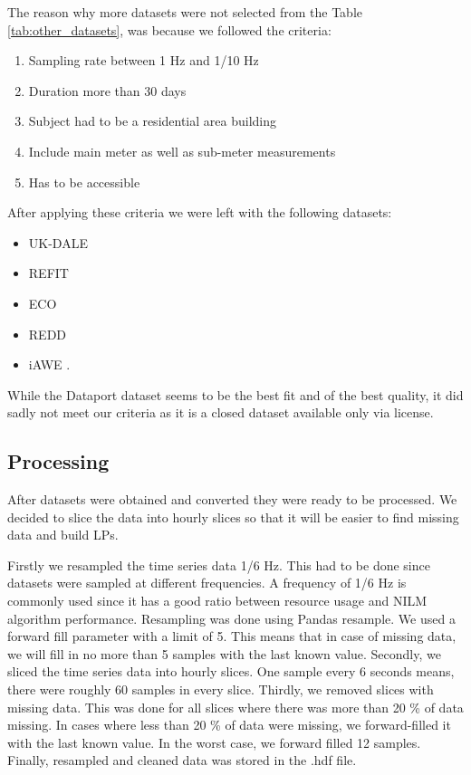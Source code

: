 The reason why more datasets were not selected from the Table \ref{tab:other_datasets},
was because we followed the criteria:
\begin{enumerate}
    \item Sampling rate between 1 Hz and 1/10 Hz
    \item Duration more than 30 days
    \item Subject had to be a residential area building
    \item Include main meter as well as sub-meter measurements
    \item Has to be accessible
\end{enumerate}

After applying these criteria we were left with the following datasets:

\begin{itemize}
    \item UK-DALE \cite{UKDALE}
    \item REFIT \cite{REFIT}
    \item ECO \cite{ECO}
    \item REDD \cite{REDD}
    \item iAWE \cite{iAWE}.
\end{itemize}

While the Dataport dataset seems to be the best fit and of the best quality, it did sadly not meet our criteria as it is a closed dataset available only via license.

\subsection{Processing}

After datasets were obtained and converted they were ready to be processed.
We decided to slice the data into hourly slices so that it will be easier to find missing data and build LPs.

Firstly we resampled the time series data  1/6 Hz. 
This had to be done since datasets were sampled at different frequencies.
A frequency of 1/6 Hz is commonly used since it has a good ratio between resource usage and NILM algorithm performance.
Resampling was done using Pandas resample. 
We used a forward fill parameter with a limit of 5.
This means that in case of missing data, we will fill in no more than 5 samples with the last known value.
Secondly, we sliced the time series data into hourly slices. 
One sample every 6 seconds means, there were roughly 60 samples in every slice.
Thirdly, we removed slices with missing data.
This was done for all slices where there was more than 20 \% of data missing.
In cases where less than 20 \% of data were missing, we forward-filled it with the last known value.
In the worst case, we forward filled 12 samples. 
Finally, resampled and cleaned data was stored in the .hdf file.


